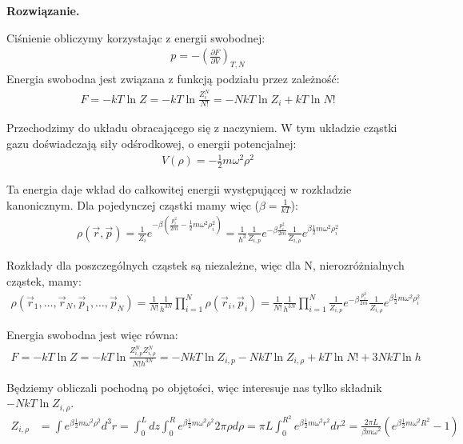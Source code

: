 \documentclass[11pt,a4paper]{article}
\newenvironment{solution}{\vspace{1cm} \par\textbf{Rozwiązanie.} \vspace{1cm}}{}
\begin{document}
\begin{solution}

Ciśnienie obliczymy korzystając z energii swobodnej:
\begin{align*}
  p = -\left( \frac{\partial F}{\partial V} \right)_{T,N}
\end{align*}
Energia swobodna jest związana z funkcją podziału przez zależność:
\begin{align*}
  F = -kT \ln Z = -kT \ln \frac{Z_{i}^N}{N!} = -NkT \ln Z_{i} + kT \ln N!
\end{align*}


Przechodzimy do układu obracającego się z naczyniem. 
W tym układzie cząstki gazu doświadczają siły odśrodkowej, o energii potencjalnej:
\begin{align*}
  V(\rho) = -\frac{1}{2} m \omega^2 \rho^2
\end{align*}

Ta energia daje wkład do całkowitej energii występującej w rozkładzie kanonicznym.
Dla pojedynczej cząstki mamy więc ($\beta = \frac{1}{kT}$):
\begin{align*}
  \rho(\vec{r},\vec{p}) = \frac{1}{Z_{i}} e^{-\beta \left( \frac{p_{i}^2}{2m} - \frac{1}{2} m \omega^2 \rho_{i}^2 \right)} =   
   \frac{1}{h^{3}} \frac{1}{Z_{i,p}} e^{-\beta \frac{p_{i}^2}{2m}} \frac{1}{Z_{i,\rho}} e^{\beta \frac{1}{2} m \omega^2 \rho_{i}^2}
\end{align*}

Rozkłady dla poszczególnych cząstek są niezależne, więc dla N, nierozróżnialnych cząstek,
mamy:
\begin{align*}
  \rho(\vec{r}_1, \ldots, \vec{r}_N, \vec{p}_1, \ldots, \vec{p}_N) =  
  \frac{1}{N!} \frac{1}{h^{3N}}\prod_{i=1}^{N} \rho(\vec{r}_i, \vec{p}_i) = 
  \frac{1}{N!} \frac{1}{h^{3N}} \prod_{i=1}^{N} \frac{1}{Z_{i,p}} e^{-\beta \frac{p_{i}^2}{2m}} \frac{1}{Z_{i,\rho}} e^{\beta \frac{1}{2} m \omega^2 \rho_{i}^2}
\end{align*}

Energia swobodna jest więc równa:
\begin{align*}
  F = -kT \ln Z = -kT \ln \frac{Z_{i,p}^N Z_{i,\rho}^N}{N!h^{3N}} = 
  -NkT \ln Z_{i,p} - NkT \ln Z_{i,\rho} + kT \ln N! + 3NkT \ln h
\end{align*}

Będziemy obliczali pochodną po objętości, więc interesuje nas tylko 
składnik $-NkT \ln Z_{i,\rho}$.
\begin{align*}
  Z_{i,\rho} &= \int e^{\beta \frac{1}{2} m \omega^2 \rho^2} d^{3}r = 
  \int_{0}^{L} dz \int_{0}^{R} e^{\beta \frac{1}{2} m \omega^2 \rho^2} 2\pi \rho d\rho = 
  \pi L  \int_{0}^{R^2} e^{\beta \frac{1}{2} m \omega^2 r^2} dr^2 = 
  \frac{2\pi L}{\beta m \omega^2} \left(e^{\beta \frac{1}{2} m \omega^2 R^2}-1\right)
\end{align*}


\end{solution}
\end{document}
